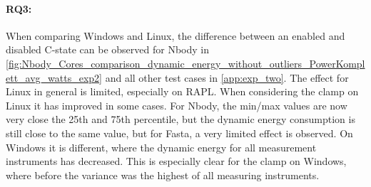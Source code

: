 \paragraph*{RQ3:} When comparing Windows and Linux, the difference between an enabled and disabled C-state can be observed for Nbody in \cref{fig:Nbody_Cores_comparison_dynamic_energy_without_outliers_PowerKomplett_avg_watts_exp2} and all other test cases in \cref{app:exp_two}. The effect for Linux in general is limited, especially on RAPL. When considering the clamp on Linux it has improved in some cases. For Nbody, the min/max values are now very close the 25th and 75th percentile, but the dynamic energy consumption is still close to the same value, but for Fasta, a very limited effect is observed. On Windows it is different, where the dynamic energy for all measurement instruments has decreased. This is especially clear for the clamp on Windows, where before the variance was the highest of all measuring instruments.




